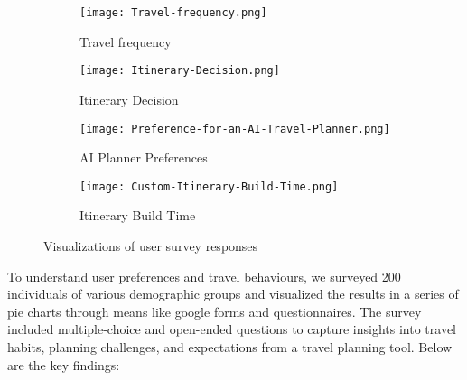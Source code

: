\documentclass[manuscript,review,anonymous]{acmart}
\begin{document}
\begin{figure}[h!]
    \centering
    \begin{subfigure}[b]{0.22\textwidth} %
        \centering
        \texttt{[image: Travel-frequency.png]} %
        \caption{Travel frequency}
        \label{fig:travel-freq}
    \end{subfigure}
    \hfill
    \begin{subfigure}[b]{0.22\textwidth} %
        \centering
        \texttt{[image: Itinerary-Decision.png]} %
        \caption{Itinerary Decision}
        \label{fig:itinerary-dec}
    \end{subfigure}
    \hfill
    \begin{subfigure}[b]{0.22\textwidth} %
        \centering
        \texttt{[image: Preference-for-an-AI-Travel-Planner.png]} %
        \caption{AI Planner Preferences}
        \label{fig:preference-planner}
    \end{subfigure}
    \hfill
    \begin{subfigure}[b]{0.22\textwidth} %
        \centering
        \texttt{[image: Custom-Itinerary-Build-Time.png]} %
        \caption{Itinerary Build Time}
        \label{fig:itinerary-time}
    \end{subfigure}
    \caption{Visualizations of user survey responses}
    \label{fig:1x4-grid-wide}
\end{figure}
    
    To understand user preferences and travel behaviours, we surveyed 200 individuals of various demographic groups and visualized the results in a series of pie charts through means like google forms and questionnaires. The survey included multiple-choice and open-ended questions to capture insights into travel habits, planning challenges, and expectations from a travel planning tool.
    Below are the key findings:
    
\end{document}

